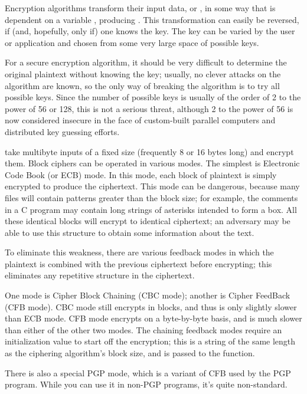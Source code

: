\documentclass{howto}
\begin{document}
Encryption algorithms transform their input data, or ,
in some way that is dependent on a variable , producing
. This transformation can easily be reversed, if (and,
hopefully, only if) one knows the key.  The key can be varied by the
user or application and chosen from some very large space of possible
keys.

For a secure encryption algorithm, it should be very difficult to
determine the original plaintext without knowing the key; usually, no
clever attacks on the algorithm are known, so the only way of breaking
the algorithm is to try all possible keys. Since the number of possible
keys is usually of the order of 2 to the power of 56 or 128, this is not
a serious threat, although 2 to the power of 56 is now considered
insecure in the face of custom-built parallel computers and distributed
key guessing efforts.

 take multibyte inputs of a fixed size
(frequently 8 or 16 bytes long) and encrypt them.  Block ciphers can
be operated in various modes.  The simplest is Electronic Code Book
(or ECB) mode.  In this mode, each block of plaintext is simply
encrypted to produce the ciphertext.  This mode can be dangerous,
because many files will contain patterns greater than the block size;
for example, the comments in a C program may contain long strings of
asterisks intended to form a box.  All these identical blocks will
encrypt to identical ciphertext; an adversary may be able to use this
structure to obtain some information about the text.

To eliminate this weakness, there are various feedback modes in which
the plaintext is combined with the previous ciphertext before
encrypting; this eliminates any repetitive structure in the
ciphertext.   

One mode is Cipher Block Chaining (CBC mode); another is Cipher
FeedBack (CFB mode).  CBC mode still encrypts in blocks, and thus is
only slightly slower than ECB mode.  CFB mode encrypts on a
byte-by-byte basis, and is much slower than either of the other two
modes.  The chaining feedback modes require an initialization value to
start off the encryption; this is a string of the same length as the
ciphering algorithm's block size, and is passed to the 
function.

There is also a special PGP mode, which is a variant
of CFB used by the PGP program.  While you can use it in non-PGP
programs, it's quite non-standard.
\end{document}
